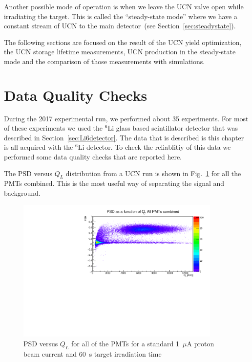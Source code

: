 Another possible mode of operation is when we leave the UCN valve open
while irradiating the target. This is called the ``steady-state
mode'' where we have a constant stream of UCN to the main
detector~(see Section~\ref{sec:steadystate}).

The following sections are focused on the result of the UCN yield
optimization, the UCN storage lifetime measurements, UCN production in
the steady-state mode and the comparison of those measurements with
simulations.


\section {Data Quality Checks}
During the 2017 experimental run, we performed about 35
experiments. For most of these experiments we used the $^6\mathrm{Li}$
glass based scintillator detector that was described in
Section~\ref{sec:Li6detector}. The data that is described is this
chapter is all acquired with the $^6\mathrm{Li}$ detector.  To check
the reliablitiy of this data we performed some data quality checks
that are reported here.



The PSD versus $Q_L$ distribution from a UCN run is shown in
Fig.~\ref{fig:psd_vs_ql} for all the PMTs combined. This is the most
useful way of separating the signal and background.
\begin{figure}[h!]
  \centering
  \includegraphics[width=0.9\textwidth]{PSD_vs_QL.pdf}
  \caption{PSD versus $Q_L$ for all of the PMTs for a standard
    1~$\mu$A proton beam current and 60~s target irradiation time }
  \label{fig:psd_vs_ql}
\end{figure}

